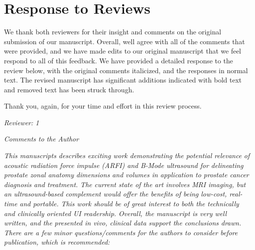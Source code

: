 \documentclass[10pt]{article}
\begin{document}
\section*{Response to Reviews}

We thank both reviewers for their insight and comments on the original
submission of our manuscript.  Overall, well agree with all of the comments
that were provided, and we have made edits to our original manuscript that we
feel respond to all of this feedback.  We have provided a detailed response to
the review below, with the original comments italicized, and the responses in
normal text.  The revised manuscript has significant additions indicated with
bold text and removed text has been struck through.

Thank you, again, for your time and effort in this review process.

\textit{Reviewer: 1}

\textit{Comments to the Author}

\textit{This manuscripts describes exciting work demonstrating the potential relevance
of acoustic radiation force impulse (ARFI) and B-Mode ultrasound for
delineating prostate zonal anatomy dimensions and volumes in application to
prostate cancer diagnosis and treatment.  The current state of the art involves
MRI imaging, but an ultrasound-based complement would offer the benefits of
being low-cost, real-time and portable.  This work should be of great interest
to both the technically and clinically oriented UI readership.  Overall, the
manuscript is very well written, and the presented in vivo, clinical data
support the conclusions drawn. There are a few minor questions/comments for the
authors to consider before publication, which is recommended:}
\end{document}
